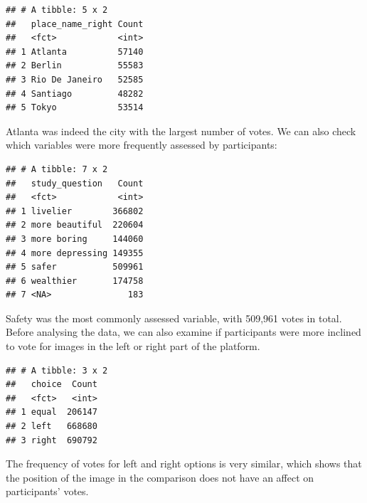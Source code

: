 \documentclass[
]{article}
\newenvironment{Shaded}{\begin{snugshade}}{\end{snugshade}}
\newcommand{\DataTypeTok}[1]{\textcolor[rgb]{0.13,0.29,0.53}{#1}}
\newcommand{\DecValTok}[1]{\textcolor[rgb]{0.00,0.00,0.81}{#1}}
\newcommand{\KeywordTok}[1]{\textcolor[rgb]{0.13,0.29,0.53}{\textbf{#1}}}
\newcommand{\NormalTok}[1]{#1}
\newcommand{\OperatorTok}[1]{\textcolor[rgb]{0.81,0.36,0.00}{\textbf{#1}}}
\newcommand{\StringTok}[1]{\textcolor[rgb]{0.31,0.60,0.02}{#1}}
\begin{document}
\begin{verbatim}
## # A tibble: 5 x 2
##   place_name_right Count
##   <fct>            <int>
## 1 Atlanta          57140
## 2 Berlin           55583
## 3 Rio De Janeiro   52585
## 4 Santiago         48282
## 5 Tokyo            53514
\end{verbatim}

Atlanta was indeed the city with the largest number of votes. We can
also check which variables were more frequently assessed by
participants:

\begin{Shaded}
\end{Shaded}

\begin{verbatim}
## # A tibble: 7 x 2
##   study_question   Count
##   <fct>            <int>
## 1 livelier        366802
## 2 more beautiful  220604
## 3 more boring     144060
## 4 more depressing 149355
## 5 safer           509961
## 6 wealthier       174758
## 7 <NA>               183
\end{verbatim}

Safety was the most commonly assessed variable, with 509,961 votes in
total. Before analysing the data, we can also examine if participants
were more inclined to vote for images in the left or right part of the
platform.

\begin{Shaded}
\end{Shaded}

\begin{verbatim}
## # A tibble: 3 x 2
##   choice  Count
##   <fct>   <int>
## 1 equal  206147
## 2 left   668680
## 3 right  690792
\end{verbatim}

The frequency of votes for left and right options is very similar, which
shows that the position of the image in the comparison does not have an
affect on participants' votes.
\end{document}
